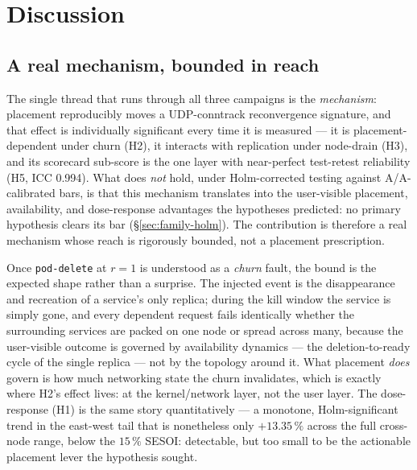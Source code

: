 \chapter{Discussion}\label{ch:discussion}

\section{A real mechanism, bounded in reach}\label{sec:decoupling}

The single thread that runs through all three campaigns is the
\emph{mechanism}: placement reproducibly moves a UDP-conntrack reconvergence
signature, and that effect is individually significant every time it is
measured --- it is placement-dependent under churn (H2), it interacts with
replication under node-drain (H3), and its scorecard sub-score is the one
layer with near-perfect test-retest reliability (H5, ICC 0.994). What does
\emph{not} hold, under Holm-corrected testing against A/A-calibrated bars, is
that this mechanism translates into the user-visible placement, availability, and
dose-response advantages the hypotheses predicted: no primary hypothesis
clears its bar (\S\ref{sec:family-holm}). The contribution is
therefore a real mechanism whose reach is rigorously bounded, not a placement
prescription.

Once \texttt{pod-delete} at $r{=}1$ is understood as a \emph{churn} fault, the
bound is the expected shape rather than a surprise. The injected event is the
disappearance and recreation of a service's only replica; during the kill
window the service is simply gone, and every dependent request fails
identically whether the surrounding services are packed on one node or spread
across many, because the user-visible outcome is governed by availability
dynamics --- the deletion-to-ready cycle of the single replica --- not by the
topology around it. What placement \emph{does} govern is how much networking
state the churn invalidates, which is exactly where H2's effect lives: at the
kernel/network layer, not the user layer. The dose-response (H1) is the same
story quantitatively --- a monotone, Holm-significant trend in the east-west
tail that is nonetheless only $+13.35\,\%$ across the full cross-node range,
below the $15\,\%$ SESOI: detectable, but too small to be the actionable
placement lever the hypothesis sought.

